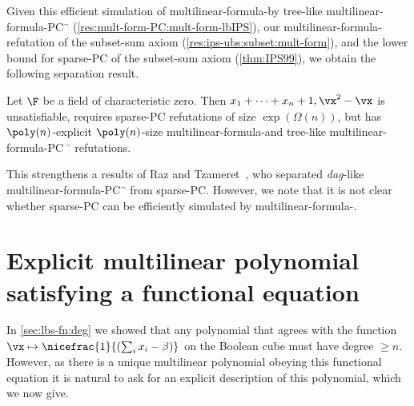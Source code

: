 \documentclass{toc}
\begin{document}
Given this efficient simulation of multilinear-formula-\lbIPS by tree-like multilinear-formula-PC$^\neg$ (\autoref{res:mult-form-PC:mult-form-lbIPS}), our multilinear-formula-\lIPS refutation of the subset-sum axiom (\autoref{res:ips-ubs:subset:mult-form}), and the lower bound for sparse-PC of the subset-sum axiom (\autoref{thm:IPS99}), we obtain the following separation result.

\begin{corollarywp}
        Let $\F$ be a field of characteristic zero. Then $x_1+\cdots+x_n+1,\vx^2-\vx$ is unsatisfiable, requires sparse-PC refutations of
%
size $\exp(\Omega(n))$,    %
but has $\poly(n)$-explicit $\poly(n)$-size multilinear-formula-\lIPS and tree-like multilinear-formula-PC$\,^\neg$ refutations.
\end{corollarywp}

This strengthens a results of Raz and Tzameret~\cite{RazTzameret08a,RazTzameret08b}, who separated \emph{dag}-like multilinear-formula-PC$^\neg$ from sparse-PC\@. However, we note that it is not clear whether sparse-PC can be efficiently simulated by multilinear-formula-\lbIPS.

%
%


\section{Explicit multilinear polynomial satisfying a functional equation}\label{sec:appendix}

In \autoref{sec:lbs-fn:deg} we showed that any polynomial that agrees with the function $\vx\mapsto \nicefrac{1}{\left(\sum_i x_i-\beta\right)}$ on the Boolean cube must have degree $\ge n$.  However, as there is a unique multilinear polynomial obeying this functional equation it is natural to ask for an explicit description of this polynomial, which we now give.
\end{document}
